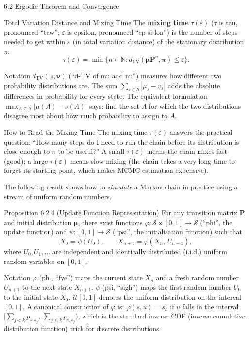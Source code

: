 \documentclass[aspectratio=169,10pt]{beamer}
\newcommand{\dTV}{d_{\mathrm{TV}}}
\newcommand{\bfP}{\mathbf{P}}
\newcommand{\bfpi}{\bm{\pi}}
\newcommand{\bfmu}{\bm{\mu}}
\newcommand{\bfv}{\bm{\nu}}
\begin{document}
\begin{frame}[allowframebreaks]{6.2 Ergodic Theorem and Convergence}
\begin{block}{Total Variation Distance and Mixing Time}
The \textbf{mixing time} $\tau(\varepsilon)$ ($\tau$ is tau, pronounced ``taw''; $\varepsilon$ is epsilon, pronounced ``ep-si-lon'') is the number of steps needed to get within $\varepsilon$ (in total variation distance) of the stationary distribution $\pi$:
\[
  \tau(\varepsilon) = \min\bigl\{ n \in \mathbb{N} : \dTV(\bfmu \bfP^n, \bfpi) \le \varepsilon \bigr\}.
\]
\end{block}

\begin{block}{Notation}
$\dTV(\bfmu, \bfv)$ (``d-TV of mu and nu'') measures how different two probability distributions are.
The sum $\sum_{s \in \mathcal{S}} |\mu_s - v_s|$ adds the absolute differences in probability for every state.
The equivalent formulation $\max_{A \subseteq \mathcal{S}} |\mu(A) - \nu(A)|$ says: find the set $A$ for which the two distributions disagree most about how much probability to assign to $A$.
\end{block}

\begin{alertblock}{How to Read the Mixing Time}
The mixing time $\tau(\varepsilon)$ answers the practical question: ``How many steps do I need to run the chain before its distribution is close enough to $\pi$ to be useful?''
A small $\tau(\varepsilon)$ means the chain mixes fast (good); a large $\tau(\varepsilon)$ means slow mixing (the chain takes a very long time to forget its starting point, which makes MCMC estimation expensive).
\end{alertblock}

\framebreak

The following result shows how to \emph{simulate} a Markov chain in practice using a stream of uniform random numbers.

\begin{block}{Proposition 6.2.4 (Update Function Representation)}
For any transition matrix $\bfP$ and initial distribution $\bfmu$, there exist functions $\varphi : \mathcal{S} \times [0,1] \to \mathcal{S}$ (``phi'', the update function) and $\psi : [0,1] \to \mathcal{S}$ (``psi'', the initialisation function) such that
\[
  X_0 = \psi(U_0), \qquad X_{n+1} = \varphi(X_n,\, U_{n+1}),
\]
where $U_0, U_1, \ldots$ are independent and identically distributed (i.i.d.) uniform random variables on $[0,1]$.
\end{block}

\begin{block}{Notation}
$\varphi$ (phi, ``fye'') maps the current state $X_n$ and a fresh random number $U_{n+1}$ to the next state $X_{n+1}$.
$\psi$ (psi, ``sigh'') maps the first random number $U_0$ to the initial state $X_0$.
$\mathcal{U}[0,1]$ denotes the uniform distribution on the interval $[0,1]$.
A canonical construction of $\varphi$ is: $\varphi(s, u) = s_k$ if $u$ falls in the interval $\bigl[\sum_{j<k} p_{s,s_j},\, \sum_{j \le k} p_{s,s_j}\bigr)$, which is the standard inverse-CDF (inverse cumulative distribution function) trick for discrete distributions.
\end{block}


\end{frame}
\end{document}
